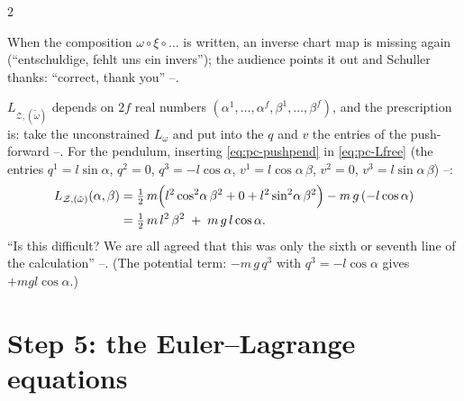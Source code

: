 \begin{paracol}{2}
\begin{coursenote}\label{cn:pc-inv2}
When the composition $\omega\circ\xi\circ\dots$ is written, an inverse chart map is missing again (``entschuldige, fehlt uns ein invers''); the audience points it out and Schuller thanks: ``correct, thank you'' --.
\end{coursenote}

$L_{\mathcal Z,(\tilde\omega)}$ depends on $2f$ real numbers $(\alpha^1,\dots,\alpha^f,\beta^1,\dots,\beta^f)$, and the prescription is: take the unconstrained $L_\omega$ and put into the $q$ and $v$ the entries of the push-forward --. For the pendulum, inserting \eqref{eq:pc-pushpend} in \eqref{eq:pc-Lfree} (the entries $q^1=l\sin\alpha$, $q^2=0$, $q^3=-l\cos\alpha$, $v^1=l\cos\alpha\,\beta$, $v^2=0$, $v^3=l\sin\alpha\,\beta$) --:
\begin{align}
  L_{\mathcal Z,(\tilde\omega)}(\alpha,\beta)
  &=\tfrac12\,m\Bigl(l^2\cos^2\!\alpha\,\beta^2+0+l^2\sin^2\!\alpha\,\beta^2\Bigr)-m\,g\,(-l\cos\alpha)\notag\\
  &=\tfrac12\,m\,l^2\,\beta^2\;+\;m\,g\,l\cos\alpha .\label{eq:pc-LZpend}
\end{align}
``Is this difficult? We are all agreed that this was only the sixth or seventh line of the calculation'' --. (The potential term: $-m\,g\,q^3$ with $q^3=-l\cos\alpha$ gives $+mgl\cos\alpha$.)

\section{Step 5: the Euler--Lagrange equations}\label{sec:pc-step5}


\end{paracol}
